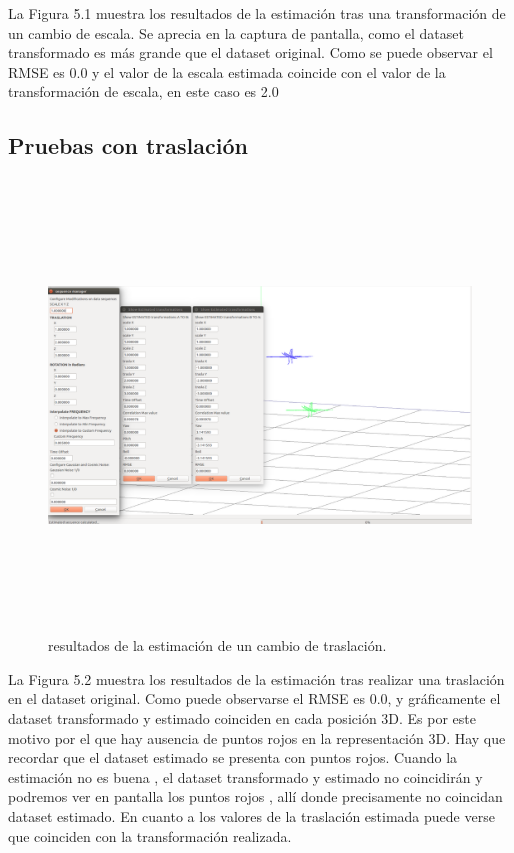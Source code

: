 La Figura 5.1 muestra los resultados de la estimación tras una transformación de un cambio de escala. Se aprecia en la captura de pantalla, como el dataset transformado es más grande que el dataset original. Como se puede observar el RMSE es 0.0 y el valor de la escala estimada coincide con el valor de la transformación de escala, en este caso es 2.0

\subsection{Pruebas con traslación}

\begin{figure}[h]
\label{fig:traslaTest}\includegraphics[height=12.0cm,width=18.0cm]{img/cap6/Traslation_abba.png}
\hspace{0.5cm}


\caption{resultados de la estimación de un cambio de traslación.}
\end{figure}


La Figura 5.2 muestra los resultados de la estimación tras realizar una traslación en el dataset original. Como puede observarse el RMSE es 0.0, y gráficamente el dataset transformado y estimado coinciden en cada posición 3D.  Es por este motivo por el que hay ausencia de puntos rojos en la representación 3D. Hay que recordar que el dataset estimado se presenta con puntos rojos. Cuando la estimación no es buena , el dataset transformado y estimado no coincidirán y podremos ver en pantalla los puntos rojos , allí donde precisamente no coincidan dataset estimado. En cuanto a los valores de la traslación estimada puede verse que coinciden con la transformación realizada.

